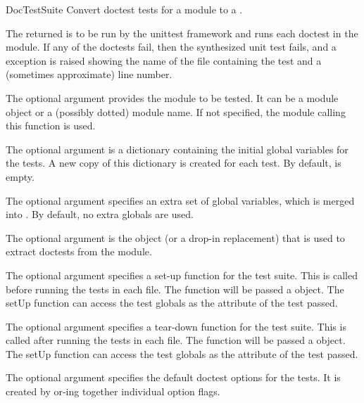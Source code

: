 \begin{funcdesc}{DocTestSuite}{}
  Convert doctest tests for a module to a
  .

  The returned  is to be run by the unittest framework
  and runs each doctest in the module.  If any of the doctests fail,
  then the synthesized unit test fails, and a 
  exception is raised showing the name of the file containing the test and a
  (sometimes approximate) line number.

  The optional argument  provides the module to be tested.  It
  can be a module object or a (possibly dotted) module name.  If not
  specified, the module calling this function is used.

  The optional argument  is a dictionary containing the
  initial global variables for the tests.  A new copy of this
  dictionary is created for each test.  By default,  is
  empty.

  The optional argument  specifies an extra set of
  global variables, which is merged into .  By default, no
  extra globals are used.

  The optional argument  is the 
  object (or a drop-in replacement) that is used to extract doctests
  from the module.

  The optional argument  specifies a set-up function for
  the test suite.  This is called before running the tests in each
  file.  The  function will be passed a 
  object.  The setUp function can access the test globals as the
   attribute of the test passed.

  The optional argument  specifies a tear-down function
  for the test suite.  This is called after running the tests in each
  file.  The  function will be passed a 
  object.  The setUp function can access the test globals as the
   attribute of the test passed.

  The optional argument  specifies the default
  doctest options for the tests.  It is created by or-ing together
  individual option flags.

\end{funcdesc}

